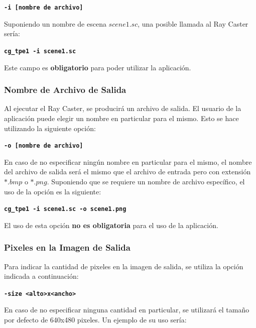 \documentclass[a4paper,10pt]{article}
\begin{document}
\begin{center}
 \textbf{\texttt{-i [nombre de archivo]}}
\end{center}

Suponiendo un nombre de escena $scene1.sc$, una posible llamada al Ray Caster ser\'ia:

\begin{center}
 \textbf{\texttt{cg\_tpe1 -i scene1.sc}}
\end{center}

Este campo es \textbf{obligatorio} para poder utilizar la aplicaci\'on.
\subsubsection{Nombre de Archivo de Salida}

Al ejecutar el Ray Caster, se producir\'a un archivo de salida.  El usuario de la aplicaci\'on puede elegir un nombre en particular para el mismo.  Esto se hace utilizando la siguiente opci\'on:

\begin{center}
  \textbf{\texttt{-o [nombre de archivo]}}
\end{center}

En caso de no especificar ning\'un nombre en particular para el mismo, el nombre del archivo de salida ser\'a el mismo que el archivo de entrada pero con extensi\'on $*.bmp$ o $*.png$.  Suponiendo que se requiere un nombre de archivo espec\'ifico, el uso de la opci\'on es la siguiente:

 \begin{center}
 \textbf{\texttt{cg\_tpe1 -i scene1.sc -o scene1.png}}
\end{center}

El uso de esta opci\'on \textbf{no es obligatoria} para el uso de la aplicaci\'on.

\subsubsection{Pixeles en la Imagen de Salida}
Para indicar la cantidad de pixeles en la imagen de salida, se utiliza la opci\'on indicada a continuaci\'on:

\begin{center}
  \textbf{\texttt{-size <alto>x<ancho>}}
\end{center}

En caso de no especificar ninguna cantidad en particular, se utilizar\'a el tama\~no por defecto de 640x480 pixeles.  Un ejemplo de su uso ser\'ia:
\end{document}
